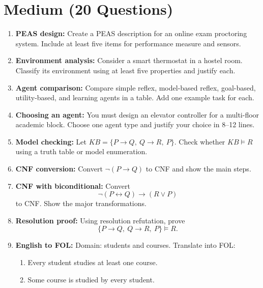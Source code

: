 \documentclass[11pt,a4paper]{article}
\begin{document}
\section*{Medium (20 Questions)}
\begin{enumerate}[label=M\arabic*., leftmargin=*]
  \item \textbf{PEAS design:} Create a PEAS description for an online exam proctoring system.
    Include at least five items for performance measure and sensors.

  \item \textbf{Environment analysis:} Consider a smart thermostat in a hostel room.
    Classify its environment using at least five properties and justify each.

  \item \textbf{Agent comparison:} Compare simple reflex, model-based reflex, goal-based, utility-based, and learning agents in a table.
    Add one example task for each.

  \item \textbf{Choosing an agent:} You must design an elevator controller for a multi-floor academic block.
    Choose one agent type and justify your choice in 8--12 lines.

  \item \textbf{Model checking:} Let $KB=\{P \rightarrow Q,\ Q \rightarrow R,\ P\}$.
    Check whether $KB \models R$ using a truth table or model enumeration.

  \item \textbf{CNF conversion:} Convert $\lnot(P \rightarrow Q)$ to CNF and show the main steps.

  \item \textbf{CNF with biconditional:} Convert
    \[
      \lnot(P \leftrightarrow Q) \rightarrow (R \lor P)
    \]
    to CNF. Show the major transformations.

  \item \textbf{Resolution proof:} Using resolution refutation, prove
    \[
      \{P \rightarrow Q,\ Q \rightarrow R,\ P\} \models R.
    \]

  \item \textbf{English to FOL:} Domain: students and courses. Translate into FOL:
    \begin{enumerate}[label=(\alph*), leftmargin=*]
      \item Every student studies at least one course.
      \item Some course is studied by every student.
    \end{enumerate}


\end{enumerate}
\end{document}
